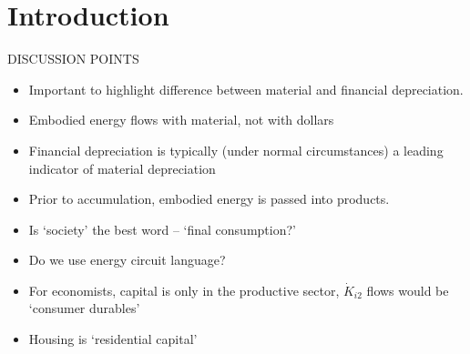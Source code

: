 %
%
%
\chapter{Introduction}
\label{chap:intro}




DISCUSSION POINTS
\begin{itemize}
\item{Important to highlight difference between material and financial depreciation.}
\item{Embodied energy flows with material, not with dollars}
\item{Financial depreciation is typically (under normal circumstances) a leading indicator of material depreciation}
\item{Prior to accumulation, embodied energy is passed into products.}
\item{Is `society' the best word – `final consumption?'}
\item{Do we use energy circuit language?}
\item{For economists, capital is only in the productive sector, $\dot{K}_{i2}$ flows would be `consumer durables'}
\item{Housing is `residential capital'}
\end{itemize}

